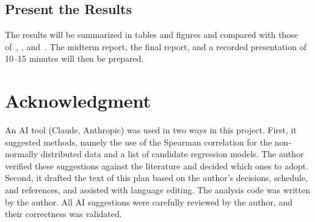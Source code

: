 \documentclass[journal]{IEEEtran}
\begin{document}
\subsection{Present the Results}
The results will be summarized in tables and figures and compared with those
of~\cite{tsanas2012}, \cite{castelli2015}, and~\cite{zegklitz2017}. The
midterm report, the final report, and a recorded presentation of 10--15 minutes will then be prepared.

\section*{Acknowledgment}
An AI tool (Claude, Anthropic) was used in two ways in this project. First, it suggested methods,
namely the use of the Spearman correlation for the non-normally distributed data and a list of candidate
regression models. The author verified these suggestions against the literature and decided which ones
to adopt. Second, it drafted the text of this plan based on the author's decisions, schedule, and
references, and assisted with language editing. The analysis code was written by the author. All AI
suggestions were carefully reviewed by the author, and their correctness was validated.
\end{document}
